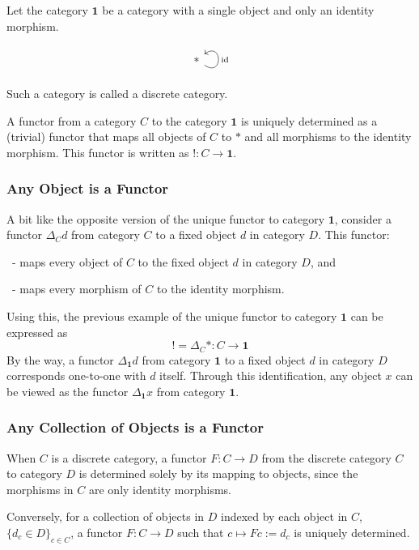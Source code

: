 \documentclass[uplatex,a4j,12pt,dvipdfmx]{jsarticle}
\begin{document}
Let the category $\textbf{1}$ be a category with a single object and only an identity morphism.
\[
	\begin{tikzcd}
		* \arrow["{\rm id}"', loop, distance=2em, in=35, out=325]
	\end{tikzcd}
\]
Such a category is called a discrete category.

A functor from a category $C$ to the category $\textbf{1}$ is uniquely determined as a (trivial) functor that maps all objects of $C$ to $*$ and all morphisms to the identity morphism.
This functor is written as $!: C \to \mathbf{1}$.


\subsubsection{Any Object is a Functor}

A bit like the opposite version of the unique functor to category $\textbf{1}$, consider a functor $\Delta_{C} d$ from category $C$ to a fixed object $d$ in category $D$.
This functor:

\ - maps every object of $C$ to the fixed object $d$ in category $D$, and

\ - maps every morphism of $C$ to the identity morphism.

Using this, the previous example of the unique functor to category $\textbf{1}$ can be expressed as
\[
	! = \Delta_{C} * : C \to \mathbf{1}
\]
By the way, a functor $\Delta_{\textbf{1}} d$ from category $\textbf{1}$ to a fixed object $d$ in category $D$ corresponds one-to-one with $d$ itself.
Through this identification, any object $x$ can be viewed as the functor $\Delta_{\textbf{1}} x$ from category $\textbf{1}$.


\subsubsection{Any Collection of Objects is a Functor}

When $C$ is a discrete category, a functor $F: C \to D$ from the discrete category $C$ to category $D$ is determined solely by its mapping to objects, since the morphisms in $C$ are only identity morphisms.

Conversely, for a collection of objects in $D$ indexed by each object in $C$, $\{ d_{c} \in D \}_{c \in C}$, a functor $F: C \to D$ such that $c \mapsto Fc := d_{c}$ is uniquely determined.
\end{document}
